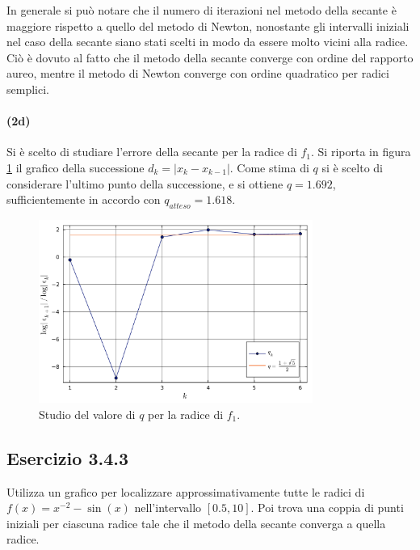 \documentclass[letterpaper, 12pt]{article}
\begin{document}
In generale si può notare che il numero di iterazioni nel metodo della secante è maggiore rispetto 
a quello del metodo di Newton, nonostante gli intervalli iniziali nel caso della secante siano stati scelti 
in modo da essere molto vicini alla radice. Ciò è dovuto al fatto che il metodo della secante converge
con ordine del rapporto aureo, mentre il metodo di Newton converge con ordine quadratico per radici semplici. \\

\paragraph{(2d) } Si è scelto di studiare l'errore della secante per la radice di $f_1$. Si riporta in figura
\ref{fig:es3_4_2_1} il grafico della successione $d_k = |x_k - x_{k-1}|$. Come stima di $q$ si è scelto di
considerare l'ultimo punto della successione, e si ottiene $q = 1.692$, sufficientemente in accordo con 
$q_{atteso} = 1.618$.
\begin{figure}[!ht]
    \centering
    \includegraphics[width=0.8\textwidth]{3421.pdf}
    \caption{Studio del valore di $q$ per la radice di $f_1$.}
    \label{fig:es3_4_2_1}
\end{figure}

\subsection{Esercizio 3.4.3}
Utilizza un grafico per localizzare approssimativamente tutte le radici di $f(x)=x^{-2}-\sin(x)$ 
nell'intervallo $[0.5,10]$. 
Poi trova una coppia di punti iniziali per ciascuna radice tale che il metodo della secante converga 
a quella radice.
\end{document}
